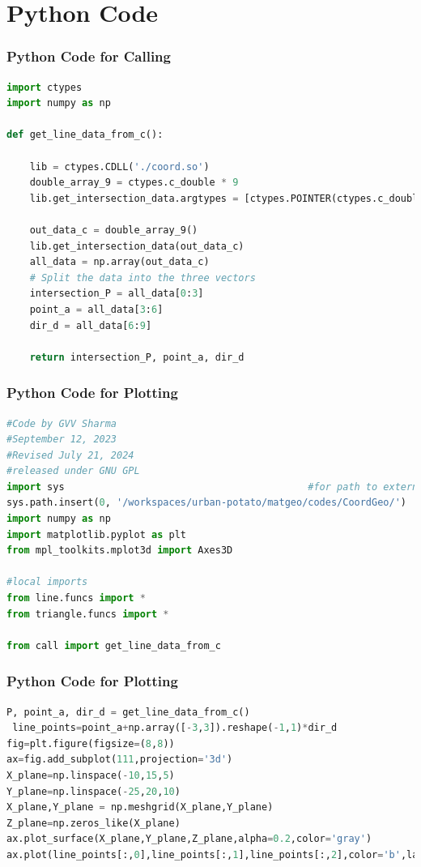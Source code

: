 \documentclass{beamer}
\theoremstyle{remark}
\numberwithin{equation}{section}
\begin{document}
\section{Python Code}
\begin{frame}[fragile]
\frametitle{Python Code for Calling}
\begin{lstlisting}[language=Python]
import ctypes
import numpy as np

def get_line_data_from_c():

    lib = ctypes.CDLL('./coord.so')
    double_array_9 = ctypes.c_double * 9
    lib.get_intersection_data.argtypes = [ctypes.POINTER(ctypes.c_double)]

    out_data_c = double_array_9()
    lib.get_intersection_data(out_data_c)
    all_data = np.array(out_data_c)
    # Split the data into the three vectors
    intersection_P = all_data[0:3]
    point_a = all_data[3:6]
    dir_d = all_data[6:9]
    
    return intersection_P, point_a, dir_d
\end{lstlisting}
\end{frame}
\begin{frame}[fragile]
\frametitle{Python Code for Plotting}
\begin{lstlisting}[language=Python]
#Code by GVV Sharma
#September 12, 2023
#Revised July 21, 2024
#released under GNU GPL
import sys                                          #for path to external scripts
sys.path.insert(0, '/workspaces/urban-potato/matgeo/codes/CoordGeo/') 
import numpy as np
import matplotlib.pyplot as plt
from mpl_toolkits.mplot3d import Axes3D

#local imports
from line.funcs import *
from triangle.funcs import *

from call import get_line_data_from_c
\end{lstlisting}
\end{frame}

\begin{frame}[fragile]
\frametitle{Python Code for Plotting}
\begin{lstlisting}[language=Python]
P, point_a, dir_d = get_line_data_from_c()
 line_points=point_a+np.array([-3,3]).reshape(-1,1)*dir_d
fig=plt.figure(figsize=(8,8))
ax=fig.add_subplot(111,projection='3d')
X_plane=np.linspace(-10,15,5)
Y_plane=np.linspace(-25,20,10)
X_plane,Y_plane = np.meshgrid(X_plane,Y_plane)
Z_plane=np.zeros_like(X_plane)
ax.plot_surface(X_plane,Y_plane,Z_plane,alpha=0.2,color='gray')
ax.plot(line_points[:,0],line_points[:,1],line_points[:,2],color='b',label='Line')
\end{lstlisting}
\end{frame}
\end{document}
